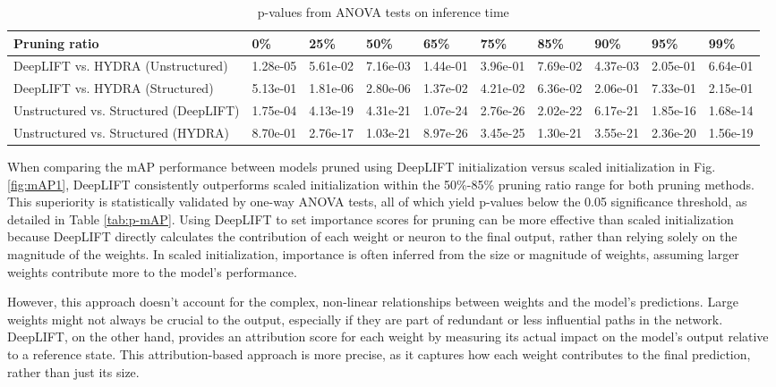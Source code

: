 \documentclass[journal,onecolumn,12pt]{IEEEtran}
\begin{document}
\begin{table}[htbp]
    \caption{p-values from ANOVA tests on inference time}
    \begin{center}
    \begin{tabular}{ |p{3cm}|p{1.2cm}|p{1.2cm}|p{1.2cm}|p{1.2cm}|p{1.2cm}|p{1.2cm}|p{1.2cm}|p{1.2cm}|p{1.2cm}|  }
     \hline
     Pruning ratio  & 0\% & 25\%& 50\%& 65\%& 75\%& 85\%& 90\%& 95\%& 99\%\\
     \hline
     DeepLIFT vs. HYDRA (Unstructured)    & 1.28e-05& 5.61e-02& 7.16e-03& 1.44e-01& 3.96e-01& 7.69e-02& 4.37e-03& 2.05e-01& 6.64e-01 \\
     DeepLIFT vs. HYDRA (Structured)     & 5.13e-01& 1.81e-06& 2.80e-06& 1.37e-02& 4.21e-02& 6.36e-02& 2.06e-01& 7.33e-01& 2.15e-01\\
     \hline
     Unstructured vs. Structured (DeepLIFT)      & 1.75e-04& 4.13e-19& 4.31e-21& 1.07e-24& 2.76e-26& 2.02e-22& 6.17e-21& 1.85e-16& 1.68e-14 \\
     Unstructured vs. Structured (HYDRA)    & 8.70e-01& 2.76e-17& 1.03e-21& 8.97e-26& 3.45e-25& 1.30e-21& 3.55e-21& 2.36e-20& 1.56e-19\\
     \hline
    \end{tabular}
    \end{center}
    \label{tab:p-time}
\end{table}


When comparing the mAP performance between models pruned using DeepLIFT initialization versus scaled initialization in Fig. \ref{fig:mAP1}, DeepLIFT consistently outperforms scaled initialization within the 50\%-85\% pruning ratio range for both pruning methods. This superiority is statistically validated by one-way ANOVA tests, all of which yield p-values below the 0.05 significance threshold, as detailed in Table \ref{tab:p-mAP}. Using DeepLIFT to set importance scores for pruning can be more effective than scaled initialization because DeepLIFT directly calculates the contribution of each weight or neuron to the final output, rather than relying solely on the magnitude of the weights. In scaled initialization, importance is often inferred from the size or magnitude of weights, assuming larger weights contribute more to the model’s performance. 

However, this approach doesn’t account for the complex, non-linear relationships between weights and the model's predictions. Large weights might not always be crucial to the output, especially if they are part of redundant or less influential paths in the network. DeepLIFT, on the other hand, provides an attribution score for each weight by measuring its actual impact on the model’s output relative to a reference state. This attribution-based approach is more precise, as it captures how each weight contributes to the final prediction, rather than just its size. 
\end{document}
